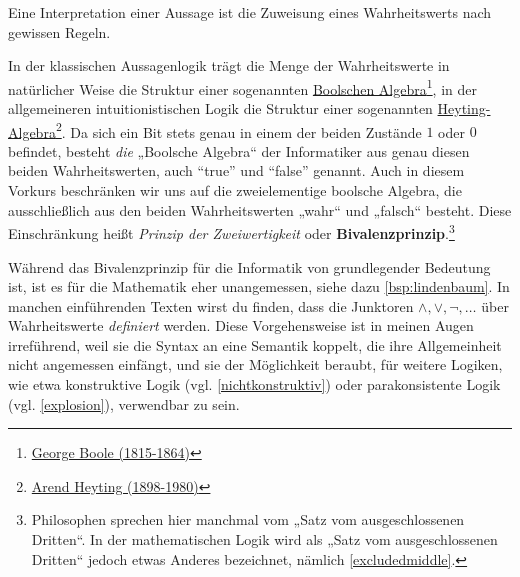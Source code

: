 \begin{vorschau}[Bivalenzprinzip] \label{bivalenz} 
    Eine Interpretation einer Aussage ist die Zuweisung eines Wahrheitswerts nach gewissen Regeln.

    In der klassischen Aussagenlogik trägt die Menge der Wahrheitswerte in natürlicher Weise die Struktur einer sogenannten \href{https://en.wikipedia.org/wiki/Boolean_algebra_(structure)}{Boolschen Algebra}\footnote{\href{https://de.wikipedia.org/wiki/George_Boole}{George Boole (1815-1864)}}, in der allgemeineren intuitionistischen Logik die Struktur einer sogenannten \href{https://ncatlab.org/nlab/show/Heyting+algebra}{Heyting-Algebra}\footnote{\href{https://de.wikipedia.org/wiki/Arend_Heyting}{Arend Heyting (1898-1980)}}. Da sich ein Bit stets genau in einem der beiden Zustände $1$ oder $0$ befindet, besteht \emph{die} „Boolsche Algebra“ der Informatiker aus genau diesen beiden Wahrheitswerten, auch ``true'' und ``false'' genannt. Auch in diesem Vorkurs beschränken wir uns auf die zweielementige boolsche Algebra, die ausschließlich aus den beiden Wahrheitswerten „wahr“ und „falsch“ besteht. Diese Einschränkung heißt \emph{Prinzip der Zweiwertigkeit} oder \textbf{Bivalenzprinzip}.\footnote{Philosophen sprechen hier manchmal vom „Satz vom ausgeschlossenen Dritten“. In der mathematischen Logik wird als „Satz vom ausgeschlossenen Dritten“ jedoch etwas Anderes bezeichnet, nämlich \cref{excludedmiddle}.}
    
    Während das Bivalenzprinzip für die Informatik von grundlegender Bedeutung ist, ist es für die Mathematik eher unangemessen, siehe dazu \cref{bsp:lindenbaum}. In manchen einführenden Texten wirst du finden, dass die Junktoren $\land,\lor,\neg,\dots$ über Wahrheitswerte \emph{definiert} werden. Diese Vorgehensweise ist in meinen Augen irreführend, weil sie die Syntax an eine Semantik koppelt, die ihre Allgemeinheit nicht angemessen einfängt, und sie der Möglichkeit beraubt, für weitere Logiken, wie etwa konstruktive Logik (vgl. \cref{nichtkonstruktiv}) oder parakonsistente Logik (vgl. \cref{explosion}), verwendbar zu sein.
\end{vorschau}


\begin{comment}
\begin{bem}[* „Konstante“ Aussagen]
    In der Aussagenlogik kann es bequem sein, Aussagezeichen einzuführen, die für eine Aussage stehen, die stets wahr oder stets falsch sein sollen:
    \begin{itemize}
        \item Mit „$\top$“ (wie englisch ``true'') ist eine Aussage gemeint, die in einem absoluten Sinn immer wahr sein soll.
        \item Mit „$\bot$“ ist eine Aussage gemeint, die in einem absoluten Sinn falsch sein soll, unabhängig davon, wie sie interpretiert wird.
    \end{itemize}
\end{bem}
\end{comment}
 

